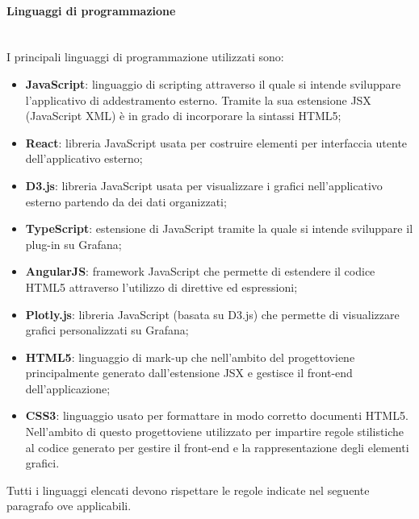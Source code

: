 			\paragraph*{Linguaggi di programmazione}\mbox{}\\ [1mm]
			I principali linguaggi di programmazione utilizzati sono:
			\begin{itemize}
				\item \textbf{JavaScript}: linguaggio di scripting attraverso il quale si intende sviluppare l'applicativo di addestramento esterno. Tramite la sua estensione JSX (JavaScript XML) è in grado di incorporare la sintassi HTML5;
				\item \textbf{React}: libreria JavaScript usata per costruire elementi per interfaccia utente dell'applicativo esterno;
				\item \textbf{D3.js}: libreria JavaScript usata per visualizzare i grafici nell'applicativo esterno partendo da dei dati organizzati;
				\item \textbf{TypeScript}: estensione di JavaScript tramite la quale si intende sviluppare il plug-in su Grafana\glo;
				\item \textbf{AngularJS}: framework JavaScript che permette di estendere il codice HTML5 attraverso l'utilizzo di direttive ed espressioni;
				\item \textbf{Plotly.js}: libreria JavaScript (basata su D3.js) che permette di visualizzare grafici personalizzati su Grafana\glo; 
				\item \textbf{HTML5}: linguaggio di mark-up che nell'ambito del progetto\glosp viene principalmente generato dall'estensione JSX e gestisce il front-end dell'applicazione;
				\item \textbf{CSS3}: linguaggio usato per formattare in modo corretto documenti HTML5. Nell'ambito di questo progetto\glosp viene utilizzato per impartire regole stilistiche al codice generato per gestire il front-end e la rappresentazione degli elementi grafici.
			\end{itemize}
			Tutti i linguaggi elencati devono rispettare le regole indicate nel seguente paragrafo ove applicabili.
